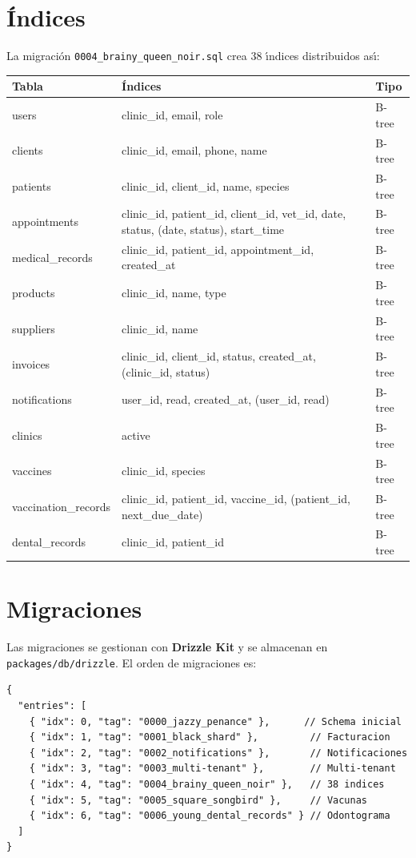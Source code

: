 \section{\'Indices}

La migraci\'on \texttt{0004\_brainy\_queen\_noir.sql} crea 38 \'{\i}ndices
distribuidos as\'{\i}:

\begin{longtable}{|l|l|l|}
\hline
\textbf{Tabla} & \textbf{\'Indices} & \textbf{Tipo} \\
\hline
\endhead
users & clinic\_id, email, role & B-tree \\
clients & clinic\_id, email, phone, name & B-tree \\
patients & clinic\_id, client\_id, name, species & B-tree \\
appointments & clinic\_id, patient\_id, client\_id, vet\_id, date,
               status, (date, status), start\_time & B-tree \\
medical\_records & clinic\_id, patient\_id, appointment\_id, created\_at & B-tree \\
products & clinic\_id, name, type & B-tree \\
suppliers & clinic\_id, name & B-tree \\
invoices & clinic\_id, client\_id, status, created\_at,
           (clinic\_id, status) & B-tree \\
notifications & user\_id, read, created\_at, (user\_id, read) & B-tree \\
clinics & active & B-tree \\
vaccines & clinic\_id, species & B-tree \\
vaccination\_records & clinic\_id, patient\_id, vaccine\_id,
                       (patient\_id, next\_due\_date) & B-tree \\
dental\_records & clinic\_id, patient\_id & B-tree \\
\hline
\end{longtable}

\section{Migraciones}

Las migraciones se gestionan con \textbf{Drizzle Kit} y se almacenan en
\texttt{packages/db/drizzle}. El orden de migraciones es:

\begin{lstlisting}[style=json, caption=\_journal.json - orden de migraciones]
{
  "entries": [
    { "idx": 0, "tag": "0000_jazzy_penance" },      // Schema inicial
    { "idx": 1, "tag": "0001_black_shard" },         // Facturacion
    { "idx": 2, "tag": "0002_notifications" },       // Notificaciones
    { "idx": 3, "tag": "0003_multi-tenant" },        // Multi-tenant
    { "idx": 4, "tag": "0004_brainy_queen_noir" },   // 38 indices
    { "idx": 5, "tag": "0005_square_songbird" },     // Vacunas
    { "idx": 6, "tag": "0006_young_dental_records" } // Odontograma
  ]
}
\end{lstlisting}


